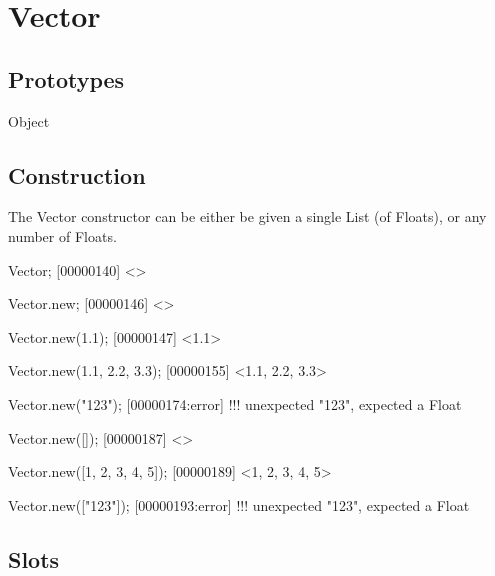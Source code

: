
\section{Vector}

\subsection{Prototypes}
\begin{refObjects}
\item[Object]
\end{refObjects}

\subsection{Construction}

The Vector constructor can be either be given a single List (of Floats), or
any number of Floats.

\begin{urbiscript}
Vector;
[00000140] <>

Vector.new;
[00000146] <>

Vector.new(1.1);
[00000147] <1.1>

Vector.new(1.1, 2.2, 3.3);
[00000155] <1.1, 2.2, 3.3>

Vector.new("123");
[00000174:error] !!! unexpected "123", expected a Float

Vector.new([]);
[00000187] <>

Vector.new([1, 2, 3, 4, 5]);
[00000189] <1, 2, 3, 4, 5>

Vector.new(["123"]);
[00000193:error] !!! unexpected "123", expected a Float
\end{urbiscript}

\subsection{Slots}

